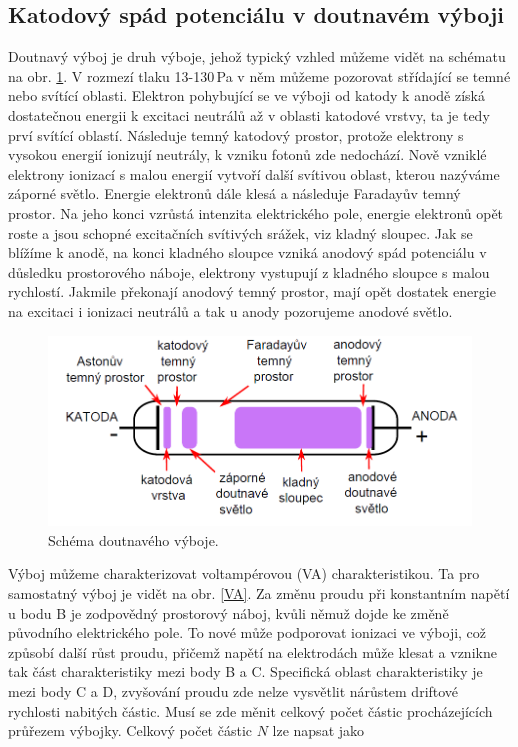 \documentclass[a4paper,12pt]{article}
\begin{document}
\subsection{Katodový spád potenciálu v doutnavém výboji}
Doutnavý výboj je druh výboje, jehož typický vzhled můžeme vidět na schématu na obr. \ref{glowdischarge}. V rozmezí tlaku 13-130\,\si{\pascal} v něm můžeme pozorovat střídající se temné nebo svítící oblasti. Elektron pohybující se ve výboji od katody k anodě získá dostatečnou energii k excitaci neutrálů až v oblasti katodové vrstvy, ta je tedy prví svítící oblastí. Následuje temný katodový prostor, protože elektrony s vysokou energií ionizují neutrály, k vzniku fotonů zde nedochází. Nově vzniklé elektrony ionizací s malou energií vytvoří další svítivou oblast, kterou nazýváme záporné světlo. Energie elektronů dále klesá a následuje Faradayův temný prostor. Na jeho konci vzrůstá intenzita elektrického pole, energie elektronů opět roste a jsou schopné excitačních svítivých srážek, viz kladný sloupec. Jak se blížíme k anodě, na konci kladného sloupce vzniká anodový spád potenciálu v důsledku prostorového náboje, elektrony vystupují z kladného sloupce s malou rychlostí. Jakmile překonají anodový temný prostor, mají opět dostatek energie na excitaci i ionizaci neutrálů a tak u anody pozorujeme anodové světlo.

\begin{figure}[h]
	\centering
	\includegraphics[width=130mm]{glowdischarge.png}
	\caption{Schéma doutnavého výboje.}
	\label{glowdischarge}
\end{figure}

Výboj můžeme charakterizovat voltampérovou (VA) charakteristikou. Ta pro samostatný výboj je vidět na obr. \ref{VA}. Za změnu proudu při konstantním napětí u bodu B je zodpovědný prostorový náboj, kvůli němuž dojde ke změně původního elektrického pole. To nové může podporovat ionizaci ve výboji, což způsobí další růst proudu, přičemž napětí na elektrodách může klesat a vznikne tak část charakteristiky mezi body B a C. Specifická oblast charakteristiky je mezi body C a D, zvyšování proudu zde nelze vysvětlit nárůstem driftové rychlosti nabitých částic. Musí se zde měnit celkový počet částic procházejících průřezem výbojky. Celkový počet částic $N$ lze napsat jako
\end{document}
